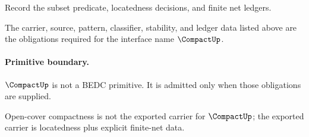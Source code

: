 \begin{definition}
\label{def:compact-ledger-policy}
Record the subset predicate, locatedness decisions, and finite net ledgers.
\end{definition}

\begin{definition}
\label{def:compact-certificate-obligations}
The carrier, source, pattern, classifier, stability, and ledger data listed
above are the obligations required for the interface name \(\CompactUp\).
\end{definition}

\paragraph{Primitive boundary.}
\(\CompactUp\) is not a BEDC primitive. It is admitted only when those
obligations are supplied.

\begin{remark}
\label{rem:compact-zero-axiom-note}
Open-cover compactness is not the exported carrier for \(\CompactUp\); the
exported carrier is locatedness plus explicit finite-net data.
\end{remark}
